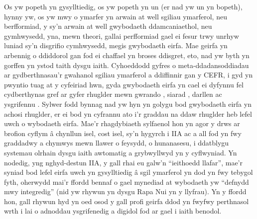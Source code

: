 Os yw popeth yn gysylltiedig, os yw popeth yn un (er nad yw un yn bopeth), hynny yw, os yw mwy o ymarfer yn arwain at well sgiliau ymarferol, neu berfformiad, y sy'n arwain at well gwybodaeth ddamcaniaethol, neu gymhwysedd, yna, mewn theori, gallai perfformiad gael ei fesur trwy unrhyw luniad sy'n disgrifio cymhwysedd, megis gwybodaeth eirfa. Mae geirfa yn arbennig o ddiddorol gan fod ei chaffael yn broses ddisgret, eto, nad yw byth yn gorffen yn ystod taith dysgu iaith. Cyhoeddodd \textcite{eun_hee_jeon_understanding_2022} gyfres o meta-ddadansoddiadau ar gydberthnasau'r gwahanol sgiliau ymarferol a ddiffinnir gan y CEFR, i gyd yn pwyntio tuag at y cyfeiriad hwn, gyda gwybodaeth eirfa yn cael ei dyfynnu fel cydberthynas gref ar gyfer rhuglder mewn gwrando \parencite{innami_meta-analysis_2022}, siarad \parencite{jeon_meta-analysis_2022}, darllen \parencite{jeon_updated_2022} ac ysgrifennu \parencite{kojima_meta-analysis_2022}. Sylwer fodd bynnag nad yw hyn yn golygu bod gwybodaeth eirfa yn achosi rhuglder, er ei bod yn cyfrannu ato i'r graddau na ddaw rhuglder heb lefel uwch o wybodaeth eirfa. Mae'r rhagdybiaeth sylfaenol hon yn agor y drws ar brofion cyflym â chynllun isel, cost isel, sy'n hygyrch i IIA ac a all fod yn fwy graddadwy a chymwys mewn llawer o feysydd, o hunanasesu, i ddatblygu systemau olrhain dysgu iaith awtomatig a grybwyllwyd yn y cyflwyniad. Yn nodedig, yng nghyd-destun IIA, y gall rhai eu galw'n ``ieithoedd llafar'', mae'r syniad bod lefel eirfa uwch yn gysylltiedig â sgil ymarferol yn dod yn fwy tebygol fyth, oherwydd mai'r ffordd bennaf o gael mynediad at wybodaeth yw ``defnydd mwy integredig'' (nid yw rhywun yn dysgu Rapa Nui yn y llyfrau). Yn y ffordd hon, gall rhywun hyd yn oed osod y gall profi geirfa ddod yn fwyfwy perthnasol wrth i lai o adnoddau ysgrifenedig a digidol fod ar gael i iaith benodol.

